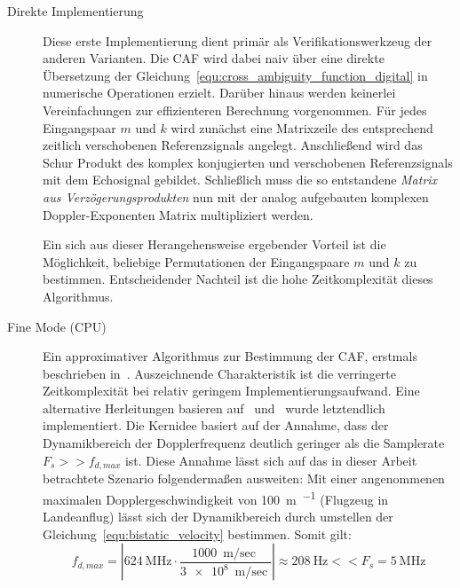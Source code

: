 \begin{description}
    \item[Direkte Implementierung]

          Diese erste Implementierung dient primär als Verifikationswerkzeug der anderen Varianten. Die CAF wird dabei naiv über eine direkte Übersetzung der Gleichung~\ref{equ:cross_ambiguity_function_digital} in numerische Operationen erzielt. Darüber hinaus werden keinerlei Vereinfachungen zur effizienteren Berechnung vorgenommen. Für jedes Eingangspaar \(m\) und \(k\) wird zunächst eine Matrixzeile des entsprechend zeitlich verschobenen Referenzsignals angelegt. Anschließend wird das Schur Produkt des komplex konjugierten und verschobenen Referenzsignals mit dem Echosignal gebildet. Schließlich muss die so entstandene \emph{Matrix aus Verzögerungsprodukten} nun mit der analog aufgebauten komplexen Doppler-Exponenten Matrix multipliziert werden.

          Ein sich aus dieser Herangehensweise ergebender Vorteil ist die Möglichkeit, beliebige Permutationen der Eingangspaare \(m\) und \(k\) zu bestimmen. Entscheidender Nachteil ist die hohe Zeitkomplexität dieses Algorithmus.
    \item[Fine Mode (CPU)]

          Ein approximativer Algorithmus zur Bestimmung der CAF, erstmals beschrieben in~\cite{Stein1981}. Auszeichnende Charakteristik ist die verringerte Zeitkomplexität bei relativ geringem Implementierungsaufwand. Eine alternative Herleitungen basieren auf~\cite{Yatrakis2001} und~\cite[S.~135--136]{Malanowski2019} wurde letztendlich implementiert. Die Kernidee basiert auf der Annahme, dass der Dynamikbereich der Dopplerfrequenz deutlich geringer als die Samplerate \(F_{s} >> f_{d,max}\) ist. Diese Annahme lässt sich auf das in dieser Arbeit betrachtete Szenario folgendermaßen ausweiten: Mit einer angenommenen maximalen Dopplergeschwindigkeit von \SI{100}{\metre\per\sec} (Flugzeug in Landeanflug) lässt sich der Dynamikbereich durch umstellen der Gleichung~\ref{equ:bistatic_velocity} bestimmen. Somit gilt: %
          \begin{equation*}
              f_{d,max} = \left| \SI{624}{\mega\hertz} \cdot \frac{\SI{1000}{\metre\per\sec}}{\SI{3e8}{\metre\per\sec}} \right| \approx \SI{208}{\hertz} << F_s = \SI{5}{\mega\hertz} %
          \end{equation*}


\end{description}

